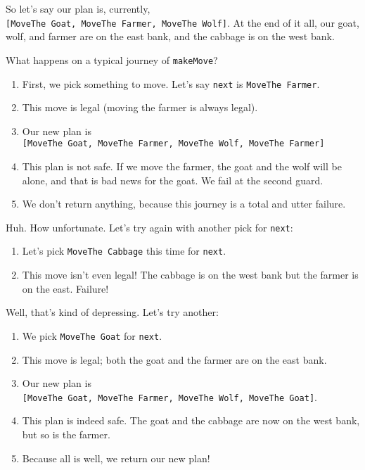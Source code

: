\documentclass[]{article}
\begin{document}
So let's say our plan is, currently,
\texttt{{[}MoveThe\ Goat,\ MoveThe\ Farmer,\ MoveThe\ Wolf{]}}. At the end of it
all, our goat, wolf, and farmer are on the east bank, and the cabbage is on the
west bank.

What happens on a typical journey of \texttt{makeMove}?

\begin{enumerate}
\def\labelenumi{\arabic{enumi}.}
\tightlist
\item
  First, we pick something to move. Let's say \texttt{next} is
  \texttt{MoveThe\ Farmer}.
\item
  This move is legal (moving the farmer is always legal).
\item
  Our new plan is
  \texttt{{[}MoveThe\ Goat,\ MoveThe\ Farmer,\ MoveThe\ Wolf,\ MoveThe\ Farmer{]}}
\item
  This plan is not safe. If we move the farmer, the goat and the wolf will be
  alone, and that is bad news for the goat. We fail at the second guard.
\item
  We don't return anything, because this journey is a total and utter failure.
\end{enumerate}

Huh. How unfortunate. Let's try again with another pick for \texttt{next}:

\begin{enumerate}
\def\labelenumi{\arabic{enumi}.}
\tightlist
\item
  Let's pick \texttt{MoveThe\ Cabbage} this time for \texttt{next}.
\item
  This move isn't even legal! The cabbage is on the west bank but the farmer is
  on the east. Failure!
\end{enumerate}

Well, that's kind of depressing. Let's try another:

\begin{enumerate}
\def\labelenumi{\arabic{enumi}.}
\tightlist
\item
  We pick \texttt{MoveThe\ Goat} for \texttt{next}.
\item
  This move is legal; both the goat and the farmer are on the east bank.
\item
  Our new plan is
  \texttt{{[}MoveThe\ Goat,\ MoveThe\ Farmer,\ MoveThe\ Wolf,\ MoveThe\ Goat{]}}.
\item
  This plan is indeed safe. The goat and the cabbage are now on the west bank,
  but so is the farmer.
\item
  Because all is well, we return our new plan!
\end{enumerate}
\end{document}
